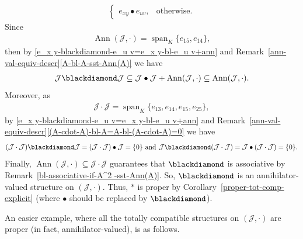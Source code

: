 \documentclass{jonasart}
\newcommand{\bl}{\bullet}
\newcommand{\J}{\mathcal{J}}
\newcommand{\sst}{\subseteq}
\DeclareMathOperator{\Ann}{Ann}
\DeclareMathOperator{\spn}{span}
\begin{document}
\begin{example}
\begin{align}
\begin{cases}
				e_{xy}\bl e_{uv}, & \text{otherwise}.
			\end{cases}
		\end{align}
		Since
		\begin{align*}
			\Ann(\J,\cdot)=\spn_K\{e_{15},e_{14}\},
		\end{align*}
		then by \eqref{e_x y-blackdiamond-e_u v=e_x y-bl-e_u v+ann} and Remark~\ref{ann-val-equiv-descr}\eqref{A-bl-A-sst-Ann(A)} we have
		\begin{align*}
			\J\blackdiamond \J\sst \J\bl \J+\Ann(\J,\cdot)\sst \Ann(\J,\cdot).
		\end{align*}
		Moreover, as
		\begin{align*}
			\J\cdot \J=\spn_K\{e_{13},e_{14},e_{15},e_{25}\},
		\end{align*}
		by \eqref{e_x y-blackdiamond-e_u v=e_x y-bl-e_u v+ann} and Remark~\ref{ann-val-equiv-descr}\eqref{(A-cdot-A)-bl-A=A-bl-(A-cdot-A)=0} we have
		\begin{align*}
			(\J\cdot \J)\blackdiamond \J=(\J\cdot \J)\bl \J=\{0\}\text{ and }\J\blackdiamond (\J\cdot \J)=\J\bl (\J\cdot \J)=\{0\}.
		\end{align*}
		Finally, $\Ann(\J,\cdot)\sst\J\cdot \J$ guarantees that $\blackdiamond$ is associative by Remark~\ref{bl-associative-if-A^2 -sst-Ann(A)}. So, $\blackdiamond$ is an annihilator-valued structure on $(\J,\cdot)$. Thus, $*$ is proper by Corollary~\ref{proper-tot-comp-explicit} (where $\bl$ should be replaced by $\blackdiamond$).
	\end{example}

	An easier example, where all the totally compatible structures on $(\J,\cdot)$ are proper (in fact, annihilator-valued), is as follows.
\end{document}
